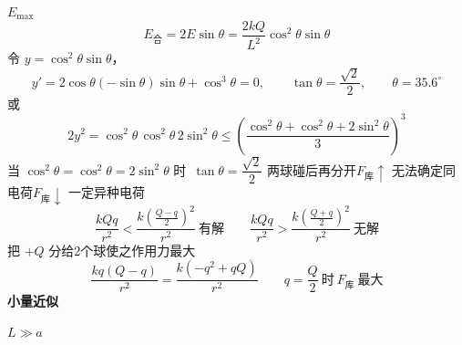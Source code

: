$E_{\max}$
\[
E_{\text{合}}=2E\sin\theta=\frac{2kQ}{L^{2}}\cos^{2}\theta\sin\theta
\]
令 $y=\cos^{2}\theta\sin\theta$，
\[
y'=2\cos\theta(-\sin\theta)\sin\theta+\cos^{3}\theta=0,\qquad
\tan\theta=\frac{\sqrt{2}}{2},\qquad \theta=35.6^\circ
\]
或\quad
\[
2y^{2}=\cos^{2}\theta\,\cos^{2}\theta\,2\sin^{2}\theta\le\left(\frac{\cos^{2}\theta+\cos^{2}\theta+2\sin^{2}\theta}{3}\right)^{3}
\]
当 $\cos^{2}\theta=\cos^{2}\theta=2\sin^{2}\theta$ 时\ $\tan\theta=\dfrac{\sqrt{2}}{2}$
两球碰后再分开\quad $F_{\text{库}}\uparrow$ 无法确定同电荷\quad $F_{\text{库}}\downarrow$ 一定异种电荷
\[
\frac{kQq}{r^{2}}<\frac{k\left(\frac{Q-q}{2}\right)^{2}}{r^{2}}\ \text{有解}\qquad
\frac{kQq}{r^{2}}>\frac{k\left(\frac{Q+q}{2}\right)^{2}}{r^{2}}\ \text{无解}
\]
把 $+Q$ 分给2个球使之作用力最大
\[
\frac{kq(Q-q)}{r^{2}}=\frac{k(-q^{2}+qQ)}{r^{2}}\qquad q=\frac{Q}{2}\ \text{时}\ F_{\text{库}}\ \text{最大}
\]
\textbf{小量近似}

$L\gg a$

